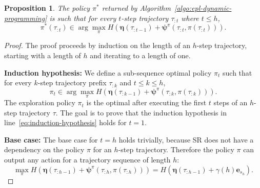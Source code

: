 \documentclass{article}
\theoremstyle{plain}
\newtheorem{proposition}[theorem]{Proposition}
\theoremstyle{definition}
\theoremstyle{remark}
\begin{document}
\begin{proposition}
    The policy $\pi^*$ returned by Algorithm~\ref{algo:epl-dynamic-programming} is such that for every $t$-step trajectory $\tau_{:t}$ where $t \le h$, 
    \begin{equation}
        \pi^*(\tau_{:t}) \in \arg \max_\pi H( \pmb{\eta}(\tau_{:t-1}) + \pmb{\psi}^\pi(\tau_{:t}, \pi(\tau_{:t})) ).
    \end{equation}
\end{proposition}
\begin{proof}
    The proof proceeds by induction on the length of an $h$-step trajectory, starting with a length of $h$ and iterating to a length of one.

    \textbf{Induction hypothesis:} 
    We define a sub-sequence optimal policy $\pi_t$ such that for every $k$-step trajectory prefix $\tau_{:k}$ and $t\le k \le h$,
    \begin{equation}
        \pi_t \in \arg \max_\pi H( \pmb{\eta}(\tau_{:{k-1}}) + \pmb{\psi}^{\pi}(\tau_{:k},\pi( \tau_{:k} )) ). \label{eq:induction-hypothesis}
    \end{equation}
    The exploration policy $\pi_t$ is the optimal after executing the first $t$ steps of an $h$-step trajectory $\tau$.
    The goal is to prove that the induction hypothesis in line~\eqref{eq:induction-hypothesis} holds for $t=1$.

    \textbf{Base case:} 
    The base case for $t=h$ holds trivially, because SR does not have a dependency on the policy $\pi$ for an $h$-step trajectory.
    Therefore the policy $\pi$ can output any action for a trajectory sequence of length $h$:
    \begin{equation}
        \max_\pi H( \pmb{\eta}(\tau_{:h-1}) + \pmb{\psi}^\pi(\tau_{:h}, \pi(\tau_{:h})) ) = H( \pmb{\eta}(\tau_{:h-1}) + \gamma(h) \pmb{e}_{s_{h}} ).
    \end{equation}


\end{proof}
\end{document}
